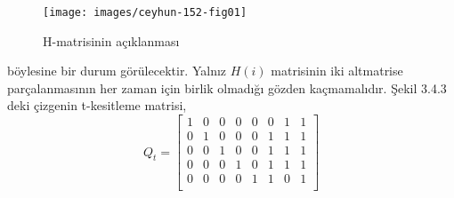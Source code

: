 \documentclass[11pt]{amsbook}
\begin{document}
\begin{figure}[htb]
	\centering
	\texttt{[image: images/ceyhun-152-fig01]}
	\caption{H-matrisinin açıklanması}
\end{figure}
\par 
böylesine bir durum görülecektir. Yalnız $H(i)$ matrisinin iki altmatrise parçalanmasının her zaman için birlik olmadığı gözden kaçmamalıdır. Şekil 3.4.3 deki çizgenin t-kesitleme matrisi,
$$ Q_t = 
\begin{bmatrix}
1 & 0 & 0 & 0 & 0 & 0 & 1 & 1 \\
0 & 1 & 0 & 0 & 0 & 1 & 1 & 1 \\
0 & 0 & 1 & 0 & 0 & 1 & 1 & 1 \\
0 & 0 & 0 & 1 & 0 & 1 & 1 & 1 \\
0 & 0 & 0 & 0 & 1 & 1 & 0 & 1\\
\end{bmatrix} $$ 
\end{document}
